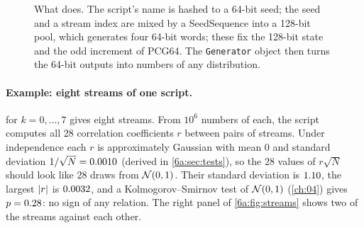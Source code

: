 \begin{figure}[htbp]
\centering
{}
\caption{What  does. The script's name is hashed to a 64-bit
seed; the seed and a stream index are mixed by a SeedSequence into a 128-bit pool,
which generates four 64-bit words; these fix the 128-bit state and the odd
increment of PCG64. The \texttt{Generator} object then turns the 64-bit outputs
into numbers of any distribution.}
\label{6a:fig:rngfor}
\end{figure}

\paragraph{Example: eight streams of one script.}
 for $k=0,\dots,7$ gives eight
streams. From $10^6$ numbers of each, the script computes all $28$ correlation
coefficients $r$ between pairs of streams. Under independence each $r$ is
approximately Gaussian with mean $0$ and standard deviation
$1/\sqrt N=0.0010$ (derived in \cref{6a:sec:tests}), so the $28$
values of $r\sqrt N$ should look like $28$ draws from $\mathcal{N}(0,1)$. Their
standard deviation is $1.10$, the largest $\left\lvert r\right\rvert$ is
$0.0032$, and a Kolmogorov--Smirnov test of $\mathcal{N}(0,1)$
(\cref{ch:04}) gives $p=0.28$: no sign of any relation. The right panel of \cref{6a:fig:streams} shows two of
the streams against each other.

